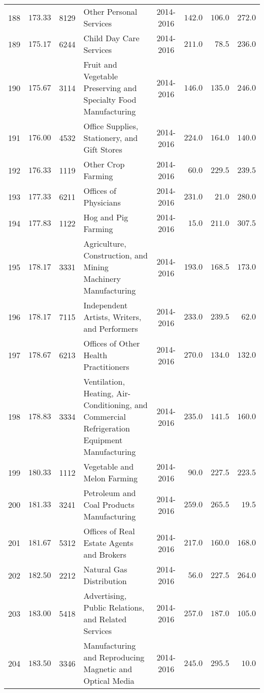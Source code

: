\documentclass[9pt, oneside]{article}   	%
\begin{document}
\begin{longtable}{cccp{2.0in}cccc}
188  & $173.33$ & 8129 & Other Personal Services & 2014-2016 & $142.0$ & $106.0$ & $272.0$ \\
189  & $175.17$ & 6244 & Child Day Care Services & 2014-2016 & $211.0$ & $\phantom{0}78.5$ & $236.0$ \\
190  & $175.67$ & 3114 & Fruit and Vegetable Preserving and Specialty Food Manufacturing & 2014-2016 & $146.0$ & $135.0$ & $246.0$ \\
191  & $176.00$ & 4532 & Office Supplies, Stationery, and Gift Stores & 2014-2016 & $224.0$ & $164.0$ & $140.0$ \\
192  & $176.33$ & 1119 & Other Crop Farming & 2014-2016 & $\phantom{0}60.0$ & $229.5$ & $239.5$ \\
193  & $177.33$ & 6211 & Offices of Physicians & 2014-2016 & $231.0$ & $\phantom{0}21.0$ & $280.0$ \\
194  & $177.83$ & 1122 & Hog and Pig Farming & 2014-2016 & $\phantom{0}15.0$ & $211.0$ & $307.5$ \\
195  & $178.17$ & 3331 & Agriculture, Construction, and Mining Machinery Manufacturing & 2014-2016 & $193.0$ & $168.5$ & $173.0$ \\
196  & $178.17$ & 7115 & Independent Artists, Writers, and Performers & 2014-2016 & $233.0$ & $239.5$ & $\phantom{0}62.0$ \\
197  & $178.67$ & 6213 & Offices of Other Health Practitioners & 2014-2016 & $270.0$ & $134.0$ & $132.0$ \\
198  & $178.83$ & 3334 & Ventilation, Heating, Air-Conditioning, and Commercial Refrigeration Equipment Manufacturing & 2014-2016 & $235.0$ & $141.5$ & $160.0$ \\
199  & $180.33$ & 1112 & Vegetable and Melon Farming & 2014-2016 & $\phantom{0}90.0$ & $227.5$ & $223.5$ \\
200  & $181.33$ & 3241 & Petroleum and Coal Products Manufacturing & 2014-2016 & $259.0$ & $265.5$ & $\phantom{0}19.5$ \\
201  & $181.67$ & 5312 & Offices of Real Estate Agents and Brokers & 2014-2016 & $217.0$ & $160.0$ & $168.0$ \\
202  & $182.50$ & 2212 & Natural Gas Distribution & 2014-2016 & $\phantom{0}56.0$ & $227.5$ & $264.0$ \\
203  & $183.00$ & 5418 & Advertising, Public Relations, and Related Services & 2014-2016 & $257.0$ & $187.0$ & $105.0$ \\
204  & $183.50$ & 3346 & Manufacturing and Reproducing Magnetic and Optical Media & 2014-2016 & $245.0$ & $295.5$ & $\phantom{0}10.0$ \\

\end{longtable}
\end{document}
